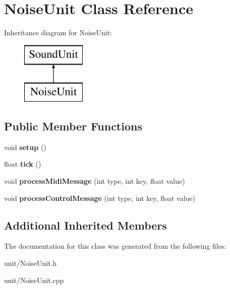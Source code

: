 \hypertarget{classNoiseUnit}{}\section{Noise\+Unit Class Reference}
\label{classNoiseUnit}
Inheritance diagram for Noise\+Unit\+:\begin{figure}[H]
\begin{center}
\leavevmode
\includegraphics[height=3.000000cm]{classNoiseUnit}
\end{center}
\end{figure}
\subsection*{Public Member Functions}
\begin{DoxyCompactItemize}
\item 
void {\bfseries setup} ()\hypertarget{classNoiseUnit_a81666e8bdea833fad6a4451a765c6b83}{}\label{classNoiseUnit_a81666e8bdea833fad6a4451a765c6b83}

\item 
float {\bfseries tick} ()\hypertarget{classNoiseUnit_af48a9a915f7f593105e8fe2d2ddb745a}{}\label{classNoiseUnit_af48a9a915f7f593105e8fe2d2ddb745a}

\item 
void {\bfseries process\+Midi\+Message} (int type, int key, float value)\hypertarget{classNoiseUnit_a58e18639dc527bb67184b38107bd6acf}{}\label{classNoiseUnit_a58e18639dc527bb67184b38107bd6acf}

\item 
void {\bfseries process\+Control\+Message} (int type, int key, float value)\hypertarget{classNoiseUnit_a755cc04254bf8ecba6082ea8d6151d6c}{}\label{classNoiseUnit_a755cc04254bf8ecba6082ea8d6151d6c}

\end{DoxyCompactItemize}
\subsection*{Additional Inherited Members}


The documentation for this class was generated from the following files\+:\begin{DoxyCompactItemize}
\item 
unit/Noise\+Unit.\+h\item 
unit/Noise\+Unit.\+cpp\end{DoxyCompactItemize}
